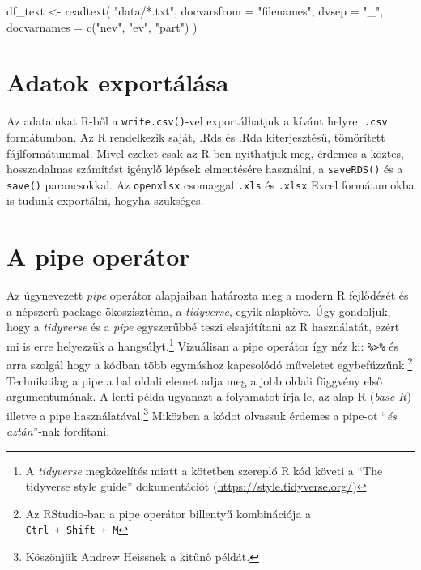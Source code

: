 \documentclass[
]{book}
\newenvironment{Shaded}{\begin{snugshade}}{\end{snugshade}}
\newcommand{\AttributeTok}[1]{\textcolor[rgb]{0.77,0.63,0.00}{#1}}
\newcommand{\FunctionTok}[1]{\textcolor[rgb]{0.00,0.00,0.00}{#1}}
\newcommand{\NormalTok}[1]{#1}
\newcommand{\OtherTok}[1]{\textcolor[rgb]{0.56,0.35,0.01}{#1}}
\newcommand{\StringTok}[1]{\textcolor[rgb]{0.31,0.60,0.02}{#1}}
\begin{document}
\begin{Shaded}
\begin{Highlighting}[]
\NormalTok{df\_text }\OtherTok{\textless{}{-}} \FunctionTok{readtext}\NormalTok{(}
  \StringTok{"data/*.txt"}\NormalTok{,}
  \AttributeTok{docvarsfrom =} \StringTok{"filenames"}\NormalTok{,}
  \AttributeTok{dvsep =} \StringTok{"\_"}\NormalTok{,}
  \AttributeTok{docvarnames =} \FunctionTok{c}\NormalTok{(}\StringTok{"nev"}\NormalTok{, }\StringTok{"ev"}\NormalTok{, }\StringTok{"part"}\NormalTok{)}
\NormalTok{)}
\end{Highlighting}
\end{Shaded}

\hypertarget{adatok-exportuxe1luxe1sa}{%
\section{Adatok exportálása}\label{adatok-exportuxe1luxe1sa}}

Az adatainkat R-ből a \texttt{write.csv()}-vel exportálhatjuk a kívánt
helyre, \texttt{.csv} formátumban. Az R rendelkezik saját, .Rds és .Rda
kiterjesztésű, tömörített fájlformátummal. Mivel ezeket csak az R-ben
nyithatjuk meg, érdemes a köztes, hosszadalmas számítást igénylő lépések
elmentésére használni, a \texttt{saveRDS()} és a \texttt{save()}
parancsokkal. Az \texttt{openxlsx} csomaggal \texttt{.xls} és
\texttt{.xlsx} Excel formátumokba is tudunk exportálni, hogyha
szükséges.

\hypertarget{a-pipe-operuxe1tor}{%
\section{A pipe operátor}\label{a-pipe-operuxe1tor}}

Az úgynevezett \emph{pipe} operátor alapjaiban határozta meg a modern R
fejlődését és a népszerű package ökoszisztéma, a \emph{tidyverse}, egyik
alapköve. Úgy gondoljuk, hogy a \emph{tidyverse} és a \emph{pipe}
egyszerűbbé teszi elsajátítani az R használatát, ezért mi is erre
helyezzük a hangsúlyt.\footnote{A \emph{tidyverse} megközelítés miatt a
  kötetben szereplő R kód követi a ``The tidyverse style guide''
  dokumentációt (\url{https://style.tidyverse.org/})} Vizuálisan a pipe
operátor így néz ki: \texttt{\%\textgreater{}\%} és arra szolgál hogy a
kódban több egymáshoz kapcsolódó műveletet egybefűzzűnk.\footnote{Az
  RStudio-ban a pipe operátor billentyű kombinációja a
  \texttt{Ctrl\ +\ Shift\ +\ M}} Technikailag a pipe a bal oldali elemet
adja meg a jobb oldali függvény első argumentumának. A lenti példa
ugyanazt a folyamatot írja le, az alap R (\emph{base R}) illetve a pipe
használatával.\footnote{Köszönjük Andrew Heissnek a kitűnő példát.}
Miközben a kódot olvassuk érdemes a pipe-ot ``\emph{és aztán}''-nak
fordítani.
\end{document}
